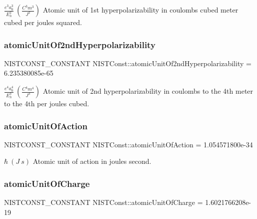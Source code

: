$\frac{e^3 a_0^3}{E_h^2} \ (\frac{C^3 m^3}{J^2})$ Atomic unit of 1st hyperpolarizability in coulombs cubed meter cubed per joules squared. \mbox{\label{group___n_i_s_t_const-_atomic_unit_gabcc03469254baef16a69abd058ae5ada}} 
\subsubsection{\texorpdfstring{atomic\+Unit\+Of2nd\+Hyperpolarizability}{atomicUnitOf2ndHyperpolarizability}}
{\footnotesize\ttfamily N\+I\+S\+T\+C\+O\+N\+S\+T\+\_\+\+C\+O\+N\+S\+T\+A\+NT N\+I\+S\+T\+Const\+::atomic\+Unit\+Of2nd\+Hyperpolarizability = 6.\+235380085e-\/65}

$\frac{e^4 a_0^4}{E_h^3} \ (\frac{C^4 m^4}{J^3})$ Atomic unit of 2nd hyperpolarizability in coulombs to the 4th meter to the 4th per joules cubed. \mbox{\label{group___n_i_s_t_const-_atomic_unit_ga7f1326edcbb03c0df4c2e81afcea7ac8}} 
\subsubsection{\texorpdfstring{atomic\+Unit\+Of\+Action}{atomicUnitOfAction}}
{\footnotesize\ttfamily N\+I\+S\+T\+C\+O\+N\+S\+T\+\_\+\+C\+O\+N\+S\+T\+A\+NT N\+I\+S\+T\+Const\+::atomic\+Unit\+Of\+Action = 1.\+054571800e-\/34}

$\hbar \ (J\ s)$ Atomic unit of action in joules second. \mbox{\label{group___n_i_s_t_const-_atomic_unit_gaa850ac93fa2ec31582147af4bcafd984}} 
\subsubsection{\texorpdfstring{atomic\+Unit\+Of\+Charge}{atomicUnitOfCharge}}
{\footnotesize\ttfamily N\+I\+S\+T\+C\+O\+N\+S\+T\+\_\+\+C\+O\+N\+S\+T\+A\+NT N\+I\+S\+T\+Const\+::atomic\+Unit\+Of\+Charge = 1.\+6021766208e-\/19}

